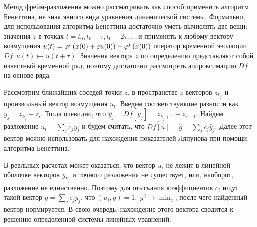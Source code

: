 Метод фрейм-разложения можно рассматривать как способ применить алгоритм Бенеттина, не зная явного вида уравнения динамической системы.
Формально, для использования алгоритма Бенеттина достаточно уметь вычислять две вещи: значения $z$ в точках $t = t_0, t_0+\tau, t_0+2\tau, \dots$ и применять к любому вектору возмущения $u(t) = {\varphi^t\left( x(0)+\varepsilon u(0) \right) - \varphi^t\left( x(0) \right)}$ оператор временной эволюции $Df: u(t) \mapsto u(t+\tau)$.
Значения вектора $z$ по определению представляют собой известный временной ряд, поэтому достаточно рассмотреть аппроксимацию $Df$ на основе ряда.

Рассмотрим ближайших соседей точки $z_i$ в пространстве $z$-векторов $z_{k_j}$ и произвольный вектор возмущения $u_i$.
Введем соответствующие разности как $y_j = z_{k_j} - z_i$.
Тогда очевидно, что $\hat{y}_j = Df [y_j] = z_{k_j+1} - z_{i+1}$.
Найдем разложение $u_i = \sum_{j} c_j y_j$ и будем считать, что $\widehat{Df[u]} = \hat{g} = \sum_j c_j \hat{y}_j$.
Далее этот вектор можно использовать для нахождения показателей Ляпунова при помощи алгоритма Бенеттина.

В реальных расчетах может оказаться, что вектор $u_i$ не лежит в линейной оболочке векторов $y_{k_j}$ и точного разложения не существует, или, наоборот, разложение не единственно.
Поэтому для отыскания коэффициентов $c_i$ ищут такой вектор $g = \sum_{j} c_j y_j$, что $\left( u_i, g \right) = 1,\; g^2 \to \min_{c}$, после чего найденный вектор нормируется.
В свою очередь, нахождение этого вектора сводится к решению определенной системы линейных уравнений.
